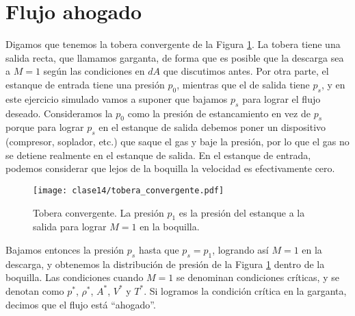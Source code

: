 \section*{Flujo ahogado}

Digamos que tenemos la tobera convergente de la Figura \ref{fig:tobera_convergente}.
La tobera tiene una salida recta, que llamamos garganta, de forma que es posible que la descarga sea a $M=1$ según las condiciones en $dA$ que discutimos antes. 
Por otra parte, el estanque de entrada tiene una presión $p_0$, mientras que el de salida tiene $p_s$, y en este ejercicio simulado vamos a suponer que bajamos $p_s$ para lograr el flujo deseado.
Consideramos la $p_0$ como la presión de estancamiento en vez de $p_s$ porque para lograr $p_s$ en el estanque de salida debemos poner un dispositivo (compresor, soplador, etc.) que saque el gas y baje la presión, por lo que el gas no se detiene realmente en el estanque de salida. 
En el estanque de entrada, podemos considerar que lejos de la boquilla la velocidad es efectivamente cero.
%
\begin{figure}
\centering
\texttt{[image: clase14/tobera\_convergente.pdf]}
\caption{Tobera convergente. La presión $p_1$ es la presión del estanque a la salida para lograr $M=1$ en la boquilla.}
\label{fig:tobera_convergente}
\end{figure}

Bajamos entonces la presión $p_s$ hasta que $p_s=p_1$, logrando así $M=1$ en la descarga, y obtenemos la distribución de presión de la Figura \ref{fig:tobera_convergente} dentro de la boquilla.
Las condiciones cuando $M=1$ se denominan condiciones críticas, y se denotan como $p^*$, $\rho^*$, $A^*$, $V^*$ y $T^*$.
Si logramos la condición crítica en la garganta, decimos que el flujo está ``ahogado''.

